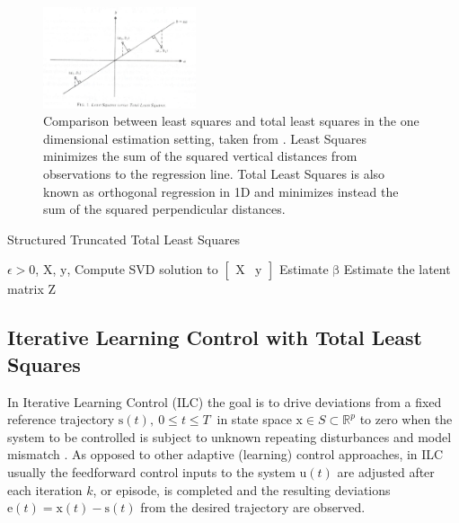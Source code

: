 \documentclass[10pt,a4paper]{article}
\newcommand{\boldvec}[1]{\boldsymbol{\mathrm{#1}}}
\let\vec\boldvec
\newcommand{\state}{\vec{x}} %
\newcommand{\error}{\vec{e}} %
\newcommand{\traj}{\vec{s}} %
\newcommand{\sysInput}{\vec{u}} %
\newcommand{\designMat}{\vec{X}} %
\newcommand{\latentMat}{\vec{Z}} %
\newcommand{\observations}{\vec{y}} %
\newcommand{\param}{\vec{\beta}} %
\newcommand{\threshold}{\epsilon}
\begin{document}
\begin{figure}
\centering
\includegraphics[width=0.4\textwidth]{LSvsTLS.jpg}%
\caption{Comparison between least squares and total least squares in the one dimensional estimation setting, taken from \cite{Golub80}. Least Squares minimizes the sum of the squared vertical distances from observations to the regression line. Total Least Squares is also known as orthogonal regression in 1D and minimizes instead the sum of the squared perpendicular distances.}
\label{Figure1}
\end{figure}
%

\begin{algorithm}[tb]
   \caption{Structured Truncated Total Least Squares}
   \label{alg1}
\begin{algorithmic}
    $\threshold > 0$, $\designMat$, $\observations$, 
   \STATE Compute SVD solution to $\begin{bmatrix} \designMat & \observations \end{bmatrix}$
   \STATE Estimate $\param$
   \STATE Estimate the latent matrix $\latentMat$ 
\end{algorithmic}
\end{algorithm}

%
\subsection{Iterative Learning Control with Total Least Squares}\label{ilcTLS}
%
In Iterative Learning Control (ILC) the goal is to drive deviations from a fixed reference trajectory $\traj(t), \ 0 \leq t \leq T \ $ in state space $\state \in S \subset \mathbb{R}^{p}$ to zero when the system to be controlled is subject to unknown repeating disturbances and model mismatch \cite{Bristow06}. As opposed to other adaptive (learning) control approaches, in ILC usually the feedforward control inputs to the system $\sysInput(t)$ are adjusted after each iteration $k$, or episode, is completed and the resulting deviations $\error(t) = \state(t) - \traj(t)$ from the desired trajectory are observed. %
\end{document}
